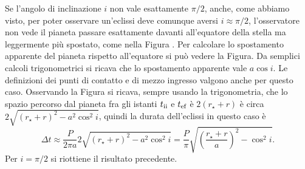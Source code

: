 Se l'angolo di inclinazione $i$ non vale esattamente $\pi/2$, anche, come
abbiamo visto, per poter osservare un'eclissi deve comunque aversi $i \approx
\pi/2$, l'osservatore non vede il pianeta passare esattamente davanti
all'equatore della stella ma leggermente più spostato, come nella Figura %
. Per calcolare lo spostamento apparente del pianeta rispetto all'equatore si
può vedere la Figura. %
Da semplici calcoli trigonometrici si ricava che lo spostamento apparente vale
$a \cos i$. Le definizioni dei punti di contatto e di mezzo ingresso valgono
anche per questo caso. Osservando la Figura %
si ricava, sempre usando la trigonometria, che lo spazio percorso dal pianeta
fra gli istanti $t_{\textup{ii}}$ e $t_{\textup{ef}}$ è $2(r_\star + r)$ è circa
$2\sqrt{(r_\star + r)^2 - a^2\cos^2 i}$, quindi la durata dell'eclissi in questo
caso è
\begin{equation}
  \Delta t \approx \frac{P}{2\pi a} 2\sqrt{(r_\star + r)^2 - a^2\cos^2 i} =
  \frac{P}{\pi} \sqrt{\left(\frac{r_\star + r}{a}\right)^2 - \cos^2 i}.
\end{equation}
Per $i = \pi/2$ si riottiene il risultato precedente.

